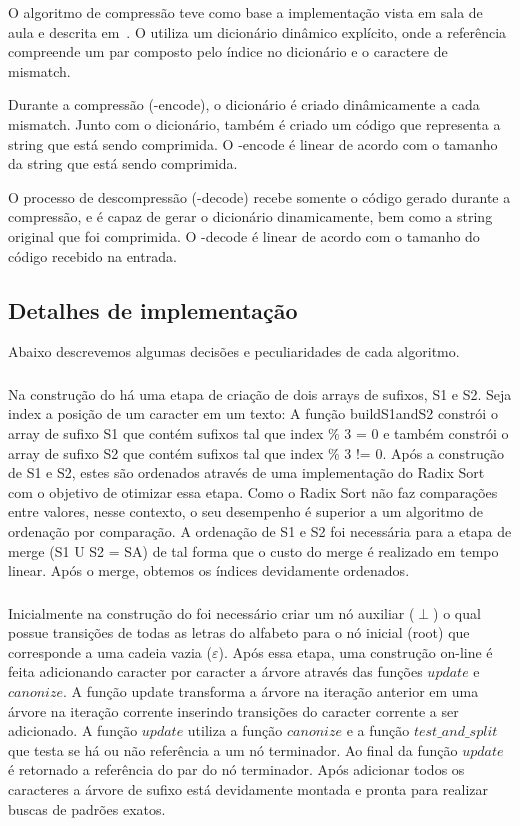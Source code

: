 O algoritmo de compressão \lz teve como base a implementação vista em sala de
aula e descrita em~\cite{Storer:1987:DCM:42791}. O \lz utiliza um dicionário
dinâmico explícito, onde a referência compreende um par composto pelo índice no
dicionário e o caractere de mismatch.

Durante a compressão (\lz-encode), o dicionário é criado dinâmicamente a cada
mismatch. Junto com o dicionário, também é criado um código que representa a
string que está sendo comprimida. O \lz-encode é linear de acordo
com o tamanho da string que está sendo comprimida.

O processo de descompressão (\lz-decode) recebe somente o código gerado durante
a compressão, e é capaz de gerar o dicionário dinamicamente, bem como a string
original que foi comprimida. O \lz-decode é linear de acordo com o tamanho do
código recebido na entrada.


\subsection{Detalhes de implementação}
Abaixo descrevemos algumas decisões e peculiaridades de cada algoritmo.

\subsubsection{\lsa}

Na construção do \lsa há uma etapa de criação de dois arrays de sufixos, S1 e S2.
Seja index a posição de um caracter em um texto:  A função buildS1andS2 constrói
o array de sufixo S1 que contém sufixos tal que index \% 3 = 0 e também constrói
o array de sufixo S2 que contém sufixos tal que index \% 3 != 0. Após a
construção de S1 e S2, estes são ordenados através de uma implementação do Radix
Sort com o objetivo de otimizar essa etapa. Como o Radix Sort não faz
comparações entre valores, nesse contexto, o seu desempenho é superior a um
algoritmo de ordenação por comparação. A ordenação de S1 e S2 foi necessária
para a etapa de merge (S1  U  S2 = SA)  de tal forma que o custo do merge é
realizado em tempo linear. Após o merge, obtemos os índices devidamente
ordenados.

\subsubsection{\lst}
Inicialmente na construção do \lst foi necessário criar um nó auxiliar ($\perp$) o qual possue transições de todas as letras do alfabeto para o nó inicial (root) que corresponde a uma cadeia vazia ($\varepsilon$). Após essa etapa, uma construção on-line é feita adicionando caracter por caracter a árvore através das funções $update$ e $canonize$. A função update transforma a árvore na iteração anterior em uma árvore na iteração corrente inserindo transições do caracter corrente a ser adicionado. A função $update$ utiliza a função $canonize$ e a função $test{\_}and{\_}split$ que testa se há ou não referência a um nó terminador. Ao final da função $update$ é retornado a referência do par do nó terminador. Após adicionar todos os caracteres a árvore de sufixo está devidamente montada e pronta para realizar buscas de padrões exatos.

